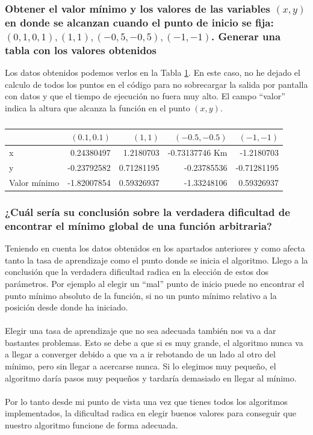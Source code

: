 \documentclass[12pt,a4paper]{article}
\begin{document}
\subsubsection{Obtener el valor mínimo y los valores de las variables \((x, y)\) en donde se alcanzan cuando el punto de inicio se fija: \((0,1, 0,1), (1, 1),(-0,5, -0,5),(-1, -1)\). Generar una tabla con los valores obtenidos}
Los datos obtenidos podemos verlos en la Tabla \ref{tab:title}. En este caso, no he dejado el calculo de todos los puntos en el código para no sobrecargar la salida por pantalla con datos y que el tiempo de ejecución no fuera muy alto. El campo ``valor'' indica la altura que alcanza la función en el punto \((x,y)\).
\begin{table}[H]

	\caption {} \label{tab:title} 
	   
	\begin{tabular}{|l|r|r|r|r|}
		\hline
		\backslashbox{Valor final}{Punto} &  \((0.1 , 0.1)\) & \((1 , 1)\) & \((-0.5 , -0.5)\) & \((-1 , -1)\)\\
		\hline
		x & 0.24380497 & 1.2180703  & -0.73137746 Km & -1.2180703\\
		\hline
		y & -0.23792582 & 0.71281195 & -0.23785536 & -0.71281195\\
		\hline
		Valor mínimo & -1.82007854 & 0.59326937 & -1.33248106 & 0.59326937\\
		\hline
	\end{tabular}
\end{table}
\subsubsection{¿Cuál sería su conclusión sobre la verdadera dificultad de encontrar el mínimo	global de una función arbitraria?}
Teniendo en cuenta los datos obtenidos en los apartados anteriores y como afecta tanto la tasa de aprendizaje como el punto donde se inicia el algoritmo. Llego a la conclusión que la verdadera dificultad radica en la elección de estos dos parámetros. Por ejemplo al elegir un ``mal'' punto de inicio puede no encontrar el punto mínimo absoluto de la función, si no un punto mínimo relativo a la posición desde donde ha iniciado. \\\\
Elegir una tasa de aprendizaje que no sea adecuada también nos va a dar bastantes problemas. Esto se debe a que si es muy grande, el algoritmo nunca va a llegar a converger debido a que va a ir rebotando de un lado al otro del mínimo, pero sin llegar a acercarse nunca. Si lo elegimos muy pequeño, el algoritmo daría pasos muy pequeños y tardaría demasiado en llegar al mínimo.\\\\
Por lo tanto desde mi punto de vista una vez que tienes todos los algoritmos implementados, la dificultad radica en elegir buenos valores para conseguir que nuestro algoritmo funcione de forma adecuada.
\end{document}
